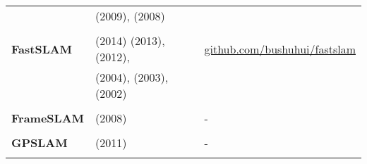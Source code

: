 \documentclass[a4paper,12pt]{scrartcl}
\begin{document}
{\begin{longtable}{l|l|l}
                                                                                                                                  & \cite{Cummins2009} (2009), \cite{Cummins2008} (2008)                                       &   \\
                                                                                                                                  &                                                                                            &   \\ [-3mm]
    \textbf{FastSLAM}                                                                                                             & \cite{Abouzahir2014} (2014) \cite{Naminski2013} (2013), \cite{Kurt-Yavuz2012} (2012),
                                                                                                                                  & {\href{https://github.com/bushuhui/fastslam}{github.com/bushuhui/fastslam}}               \\
                                                                                                                                  & \cite{Thrun2004} (2004), \cite{Montemerlo2003} (2003), \cite{Montemerlo2002} (2002)        &   \\
                                                                                                                                  &                                                                                            &   \\ [-3mm]
    \textbf{FrameSLAM}                                                                                                            & \cite{Konolige2008} (2008)                                                                 & - \\
                                                                                                                                  &                                                                                            &   \\ [-3mm]
    \textbf{GPSLAM}                                                                                                               & \cite{Pirker2011a} (2011)                                                                  & - \\
                                                                                                                                  &                                                                                            &   \\ [-3mm]

\end{longtable}}
\end{document}
